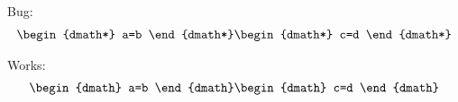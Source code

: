 \documentclass[12pt]{article}
\begin{document}
Bug:
\begin{dgroup}
\begin{dmath*}
a=b
\end{dmath*}
\begin{dmath*}
c=d
\end{dmath*}
\end{dgroup}

Works:
\begin{dgroup}
\begin{dmath}
a=b
\end{dmath}
\begin{dmath}
c=d
\end{dmath}
\end{dgroup}
\end{document}
